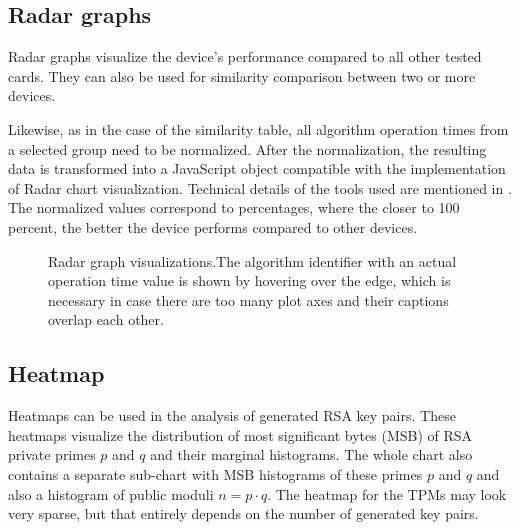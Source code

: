 \subsection{Radar graphs}
Radar graphs visualize the device's performance compared to all other tested cards. They can also be used for similarity comparison between two or more devices.

Likewise, as in the case of the similarity table, all algorithm operation times from a selected group need to be normalized. After the normalization, the resulting data is transformed into a JavaScript object compatible with the implementation of Radar chart visualization. Technical details of the tools used are mentioned in . The normalized values correspond to percentages, where the closer to 100 percent, the better the device performs compared to other devices. 

\begin{figure}[H]
  \centering
  \hfill
  \caption{Radar graph visualizations.The algorithm identifier with an actual operation time value is shown by hovering over the edge, which is necessary in case there are too many plot axes and their captions overlap each other.}
\end{figure}

\subsection{Heatmap}
Heatmaps can be used in the analysis of generated RSA key pairs. These heatmaps visualize the distribution of most significant bytes (MSB) of RSA private primes $p$ and $q$ and their marginal histograms. The whole chart also contains a separate sub-chart with MSB histograms of these primes $p$ and $q$ and also a histogram of public moduli $n = p \cdot q$. The heatmap for the TPMs may look very sparse, but that entirely depends on the number of generated key pairs.

